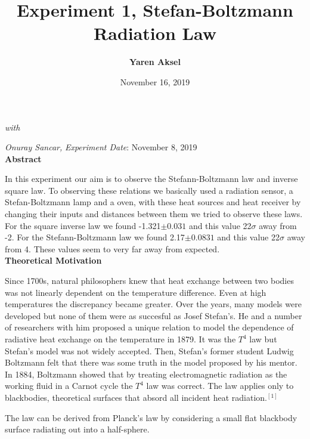 \documentclass[11pt,a4paper]{article}
\begin{document}
	\author{\textbf{Yaren Aksel}}
	\title{\textbf{Experiment 1, Stefan-Boltzmann Radiation Law}}
	\date{November 16, 2019}
	\maketitle
	\textit{with} {\large\textit{{Onuray Sancar}}\textit{,} \textit{Experiment Date}: November 8, 2019\\[2\baselineskip]
		\textbf{Abstract}\\[\baselineskip]
		\par In this experiment our aim is to observe the Stefann-Boltzmann law and inverse square law. To observing these relations we basically used a radiation sensor, a Stefan-Boltzmann lamp and a oven, with these heat sources and heat receiver by changing their inputs and distances between them we tried to observe these laws. For the square inverse law we found -1.321$\pm0.031$ and this value 22$\sigma$ away from -2. For the Stefann-Boltzmann law we found 2.17$\pm0.0831$ and this value 22$\sigma$ away from 4. These values seem to very far away from expected.
			\\[\baselineskip]
		\textbf{Theoretical Motivation}
		\\[\baselineskip]
		\par Since 1700s, natural philosophers knew that heat exchange between two bodies was not linearly dependent on the temperature difference. Even at high temperatures the discrepancy became greater. Over the years, many models were developed but none of them were as succesful as Josef Stefan's. He and a number of researchers with him proposed a unique relation to model the dependence of radiative heat exchange on the temperature in 1879. It was the $T^4$ law but Stefan's model was not widely accepted. Then, Stefan's former student Ludwig Boltzmann felt that there was some truth in the model proposed by his mentor. In 1884, Boltzmann showed that by treating electromagnetic radiation as the working fluid in a Carnot cycle the $T^4$ law was correct. The law applies only to blackbodies, theoretical surfaces that absord all incident heat radiation.$^{[1]}$
		\par The law can be derived from Planck's law by considering a small flat blackbody surface radiating out into a half-sphere.
		\begin{figure}[H]
			\begin{center}

\end{center}
\end{figure}}
\end{document}
